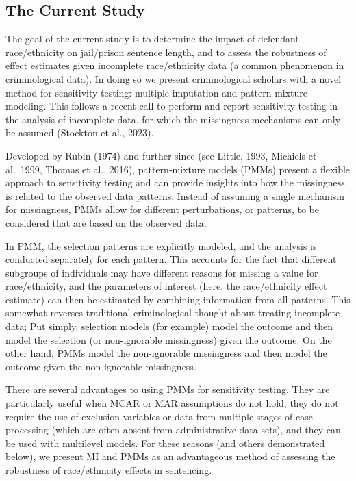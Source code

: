 \documentclass[
  letterpaper,
  DIV=11,
  numbers=noendperiod]{scrartcl}
\begin{document}
\hypertarget{the-current-study}{%
\subsection{The Current Study}\label{the-current-study}}

The goal of the current study is to determine the impact of defendant
race/ethnicity on jail/prison sentence length, and to assess the
robustness of effect estimates given incomplete race/ethnicity data (a
common phenomenon in criminological data). In doing so we present
criminological scholars with a novel method for sensitivity testing:
multiple imputation and pattern-mixture modeling. This follows a recent
call to perform and report sensitivity testing in the analysis of
incomplete data, for which the missingness mechanisms can only be
assumed (Stockton et al., 2023).

Developed by Rubin (1974) and further since (see Little, 1993, Michiels
et al.~1999, Thomas et al., 2016), pattern-mixture models (PMMs) present
a flexible approach to sensitivity testing and can provide insights into
how the missingness is related to the observed data patterns. Instead of
assuming a single mechanism for missingness, PMMs allow for different
perturbations, or patterns, to be considered that are based on the
observed data.

In PMM, the selection patterns are explicitly modeled, and the analysis
is conducted separately for each pattern. This accounts for the fact
that different subgroups of individuals may have different reasons for
missing a value for race/ethnicity, and the parameters of interest
(here, the race/ethnicity effect estimate) can then be estimated by
combining information from all patterns. This somewhat reverses
traditional criminological thought about treating incomplete data; Put
simply, selection models (for example) model the outcome and then model
the selection (or non-ignorable missingness) given the outcome. On the
other hand, PMMs model the non-ignorable missingness and then model the
outcome given the non-ignorable missingness.

There are several advantages to using PMMs for sensitivity testing. They
are particularly useful when MCAR or MAR assumptions do not hold, they
do not require the use of exclusion variables or data from multiple
stages of case processing (which are often absent from administrative
data sets), and they can be used with multilevel models. For these
reasons (and others demonstrated below), we present MI and PMMs as an
advantageous method of assessing the robustness of race/ethnicity
effects in sentencing.
\end{document}
